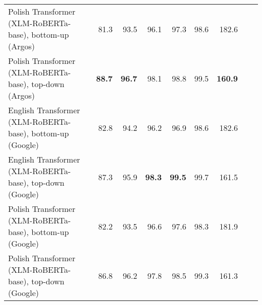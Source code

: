 \begin{table}[ht!]
{\begin{tabular}{lrrrrrrrr}
  Polish Transformer (XLM-RoBERTa-base), bottom-up (Argos) & 81.3 & 93.5 & 96.1 & 97.3 & 98.6 & 182.6 \\ 
  Polish Transformer (XLM-RoBERTa-base), top-down (Argos) & \textbf{88.7} & \textbf{96.7} & 98.1 & 98.8 & 99.5 & \textbf{160.9} \\ 
  English Transformer (XLM-RoBERTa-base), bottom-up (Google) & 82.8 & 94.2 & 96.2 & 96.9 & 98.6 & 182.6 \\ 
  English Transformer (XLM-RoBERTa-base), top-down (Google) & 87.3 & 95.9 & \textbf{98.3} & \textbf{99.5} & 99.7 & 161.5 \\ 
  Polish Transformer (XLM-RoBERTa-base), bottom-up (Google) & 82.2 & 93.5 & 96.6 & 97.6 & 98.3 & 181.9 \\ 
  Polish Transformer (XLM-RoBERTa-base), top-down (Google) & 86.8 & 96.2 & 97.8 & 98.5 & 99.3 & 161.3 \\ 
   \hline
\end{tabular}
}
\end{table}




